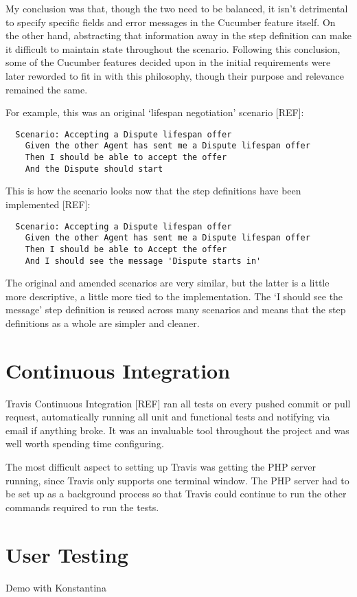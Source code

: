 My conclusion was that, though the two need to be balanced, it isn't detrimental to specify specific fields and error messages in the Cucumber feature itself. On the other hand, abstracting that information away in the step definition can make it difficult to maintain state throughout the scenario. Following this conclusion, some of the Cucumber features decided upon in the initial requirements were later reworded to fit in with this philosophy, though their purpose and relevance remained the same.

For example, this was an original `lifespan negotiation' scenario [REF]: %

\begin{lstlisting}
  Scenario: Accepting a Dispute lifespan offer
    Given the other Agent has sent me a Dispute lifespan offer
    Then I should be able to accept the offer
    And the Dispute should start
\end{lstlisting}

This is how the scenario looks now that the step definitions have been implemented [REF]: %

\begin{lstlisting}
  Scenario: Accepting a Dispute lifespan offer
    Given the other Agent has sent me a Dispute lifespan offer
    Then I should be able to Accept the offer
    And I should see the message 'Dispute starts in'
\end{lstlisting}

The original and amended scenarios are very similar, but the latter is a little more descriptive, a little more tied to the implementation. The `I should see the message' step definition is reused across many scenarios and means that the step definitions as a whole are simpler and cleaner.

\section{Continuous Integration}

Travis Continuous Integration [REF] ran all tests on every pushed commit or pull request, automatically running all unit and functional tests and notifying via email if anything broke. It was an invaluable tool throughout the project and was well worth spending time configuring.

The most difficult aspect to setting up Travis was getting the PHP server running, since Travis only supports one terminal window. The PHP server had to be set up as a background process so that Travis could continue to run the other commands required to run the tests.

\section{User Testing}

Demo with Konstantina